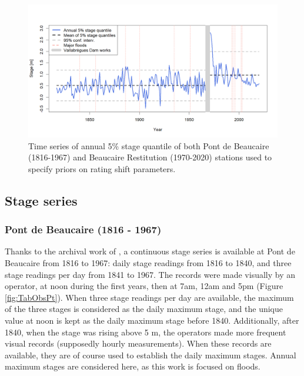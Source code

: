 \documentclass[11pt]{article}
\begin{document}
    \begin{figure}[h]
        \centering
        \includegraphics[width = 12cm]{Figs/5-Quant5perc_both.png}
        \caption{Time series of annual 5\% stage quantile of both Pont de Beaucaire (1816-1967) and Beaucaire Restitution (1970-2020) stations used to specify priors on rating shift parameters.}
        \label{fig:quantile5_both}
    \end{figure}
        
    \subsection{Stage series}

    \subsubsection{Pont de Beaucaire (1816 - 1967)}
    
    Thanks to the archival work of \citet{pichard_hydro-climatology_2017}, a continuous stage series is available at Pont de Beaucaire from 1816 to 1967: daily stage readings from 1816 to 1840, and three stage readings per day from 1841 to 1967. The records were made visually by an operator, at noon during the first years, then at 7am, 12am and 5pm (Figure \ref{fig:TabObsPt}). When three stage readings per day are available, the maximum of the three stages is considered as the daily maximum stage, and the unique value at noon is kept as the daily maximum stage before 1840. Additionally, after 1840, when the stage was rising above 5 m, the operators made more frequent visual records (supposedly hourly measurements). When these records are available, they are of course used to establish the daily maximum stages. Annual maximum stages are considered here, as this work is focused on floods. 
    
\end{document}
